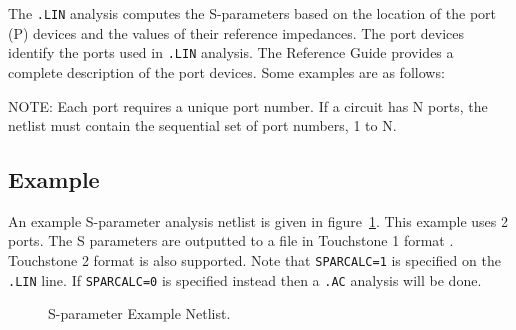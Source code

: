 The \verb|.LIN| analysis computes the S-parameters based on the location of the port (P)
devices and the values of their reference impedances. The port devices identify
the ports used in \verb|.LIN| analysis. The \Xyce{} Reference Guide\ReferenceGuide{} 
provides a complete description of the port devices. Some examples are as follows:


NOTE:  Each port requires a unique port number. If a circuit has N ports, the netlist must
contain the sequential set of port numbers, 1 to N.  	

\subsection{Example}
An example S-parameter analysis netlist is given in figure~\ref{spExample}.  This example uses 2 ports.
The S parameters are outputted to a file in Touchstone 1 format \cite{touchstone2_std_2009}.
Touchstone 2 format is also supported.  Note that \texttt{SPARCALC=1} is specified on
the \texttt{.LIN} line.  If \texttt{SPARCALC=0} is specified instead then a \texttt{.AC}
analysis will be done.

\begin{figure}[htbp]
  \begin{centering}
\caption[S-parameter Example Netlist]
{S-parameter Example Netlist.  \label{spExample} }
\end{centering}
\end{figure}

